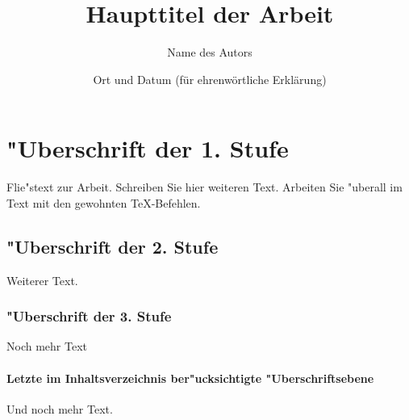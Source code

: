 \documentclass[NEUTRAL,ngerman]{tumbook}
\title{Haupttitel der Arbeit}
\author{Name des Autors}
\date{Ort und Datum (f\"ur ehrenw\"ortliche Erkl\"arung)}
\begin{document}
\maketitle%
\tableofcontents%

\chapter{"Uberschrift der 1. Stufe}

Flie"stext zur Arbeit. Schreiben Sie hier weiteren Text. Arbeiten
Sie "uberall im Text mit den gewohnten \TeX{}-Befehlen.
\nocite{*}%

\section{"Uberschrift der 2. Stufe}

Weiterer Text.

\subsection{"Uberschrift der 3. Stufe}

Noch mehr Text

\subsubsection{Letzte im Inhaltsverzeichnis ber"ucksichtigte "Uberschriftsebene}

Und noch mehr Text.

\clearpage
\appendix%
\listoffigures%
\clearpage
\Ehrenwort%
\end{document}
